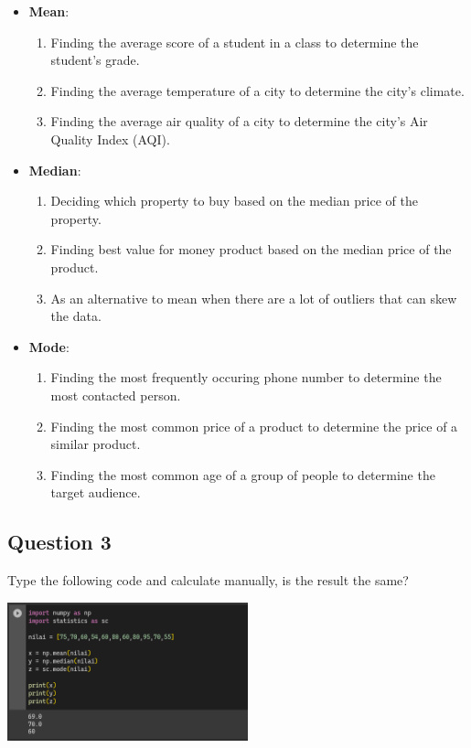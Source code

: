\documentclass[12pt,titlepage]{article}
\begin{document}
\begin{itemize}
    \item {
        \textbf{Mean}:
        \begin{enumerate}
            \item Finding the average score of a student in a class to determine the student's grade.
            \item Finding the average temperature of a city to determine the city's climate.
            \item Finding the average air quality of a city to determine the city's Air Quality Index (AQI).
        \end{enumerate}
    }
    \item {
        \textbf{Median}:
        \begin{enumerate}
            \item Deciding which property to buy based on the median price of the property.
            \item Finding best value for money product based on the median price of the product.
            \item As an alternative to mean when there are a lot of outliers that can skew the data.
        \end{enumerate}
    }
    \item {
        \textbf{Mode}:
        \begin{enumerate}
            \item Finding the most frequently occuring phone number to determine the most contacted person.
            \item Finding the most common price of a product to determine the price of a similar product.
            \item Finding the most common age of a group of people to determine the target audience.
        \end{enumerate}
    }
\end{itemize}
\pagebreak

\subsection{Question 3}
Type the following code and calculate manually, is the result the same?

\begin{center}
    \includegraphics[height=4cm]{./images/q3.png}
\end{center}
\end{document}
